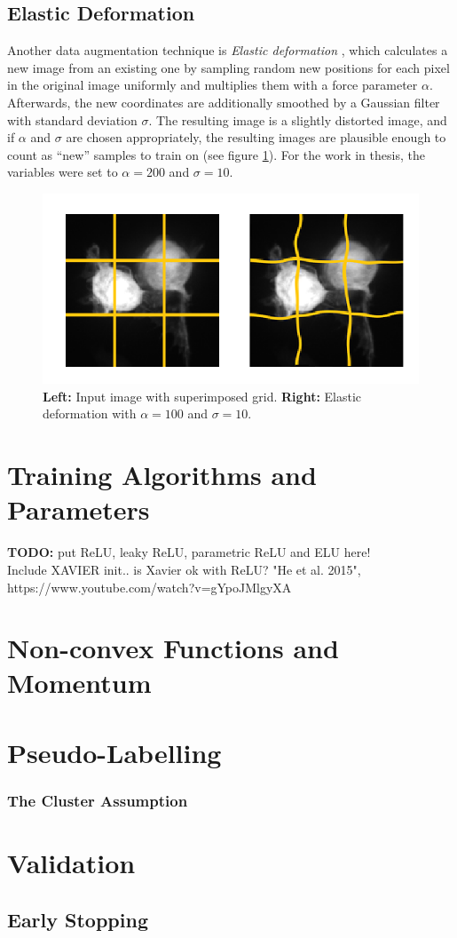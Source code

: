 		\subsection{Elastic Deformation}
Another data augmentation technique is \textit{Elastic deformation} \cite{elastic}, which calculates a new image from an existing one by sampling random new positions for each pixel in the original image uniformly and multiplies them with a force parameter $\alpha$. Afterwards, the new coordinates are additionally smoothed by a Gaussian filter with standard deviation $\sigma$. The resulting image is a slightly distorted image, and if $\alpha$ and $\sigma$ are chosen appropriately, the resulting images are plausible enough to count as ``new'' samples to train on (see figure \ref{fig:elastic}). For the work in thesis, the variables were set to $\alpha = 200$ and $\sigma = 10$.


\begin {figure}[!ht]
	\begin{center}
		\includegraphics[scale=0.80]{img/fig_elastic.png}
	\end{center}
	\caption[]{\textbf{Left:} Input image with superimposed grid. \textbf{Right:} Elastic deformation with $\alpha = 100$ and $\sigma = 10$.}
	\label{fig:elastic}
\end {figure}

	\section {Training Algorithms and Parameters}
	\textbf{TODO:} put ReLU, leaky ReLU, parametric ReLU and ELU here!\\ Include XAVIER init.. is Xavier ok with ReLU? "He et al. 2015", https://www.youtube.com/watch?v=gYpoJMlgyXA
	
	\section{Non-convex Functions and Momentum}

	\section {Pseudo-Labelling}

		\subsubsection {The Cluster Assumption}

	\section {Validation}
		
		\subsection{Early Stopping}